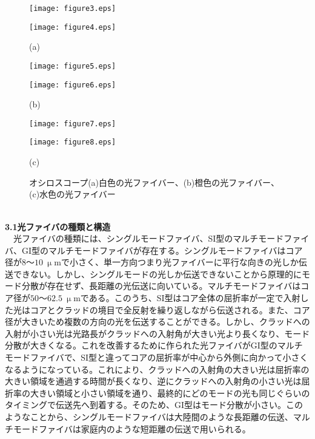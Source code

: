 \documentclass[a4paper,10.5pt]{ltjsarticle}
\begin{document}
\begin{figure}[h]
  \centering
  \vspace{20pt}\begin{minipage}[h]{0.8\linewidth}
    \begin{minipage}[h]{0.53\linewidth}
      \texttt{[image: figure3.eps]}
    \end{minipage}
    \begin{minipage}[h]{0.5\linewidth}
      \texttt{[image: figure4.eps]}
    \end{minipage}
    \caption*{(a)}
  \end{minipage}
  \begin{minipage}[h]{0.8\linewidth}
    \begin{minipage}[h]{0.53\linewidth}
      \texttt{[image: figure5.eps]}
    \end{minipage}
    \begin{minipage}[h]{0.5\linewidth}
      \texttt{[image: figure6.eps]}
    \end{minipage}
    \caption*{(b)}
  \end{minipage}
  \begin{minipage}[h]{0.8\linewidth}
    \begin{minipage}[h]{0.53\linewidth}
      \texttt{[image: figure7.eps]}
    \end{minipage}
    \begin{minipage}[h]{0.5\linewidth}
      \texttt{[image: figure8.eps]}
    \end{minipage}
    \caption*{(c)}
  \end{minipage}
  \caption{オシロスコープ(a)白色の光ファイバー、(b)橙色の光ファイバー、(c)水色の光ファイバー}
  \label{scope}
\end{figure}
\clearpage
\hspace{-2pt}{\Large \bfseries 3.考察}\\
{\large \bfseries 3.1光ファイバの種類と構造}\\
　光ファイバの種類には、シングルモードファイバ、SI型のマルチモードファイバ、GI型のマルチモードファイバが存在する。シングルモードファイバはコア径が$8〜10\ \mathrm{\upmu m}$で小さく、単一方向つまり光ファイバーに平行な向きの光しか伝送できない。しかし、シングルモードの光しか伝送できないことから原理的にモード分散が存在せず、長距離の光伝送に向いている。マルチモードファイバはコア径が$50〜62.5\ \mathrm{\upmu m}$である。このうち、SI型はコア全体の屈折率が一定で入射した光はコアとクラッドの境目で全反射を繰り返しながら伝送される。また、コア径が大きいため複数の方向の光を伝送することができる。しかし、クラッドへの入射が小さい光は光路長がクラッドへの入射角が大きい光より長くなり、モード分散が大きくなる。これを改善するために作られた光ファイバがGI型のマルチモードファイバで、SI型と違ってコアの屈折率が中心から外側に向かって小さくなるようになっている。これにより、クラッドへの入射角の大きい光は屈折率の大きい領域を通過する時間が長くなり、逆にクラッドへの入射角の小さい光は屈折率の大きい領域と小さい領域を通り、最終的にどのモードの光も同じぐらいのタイミングで伝送先へ到着する。そのため、GI型はモード分散が小さい。このようなことから、シングルモードファイバは大陸間のような長距離の伝送、マルチモードファイバは家庭内のような短距離の伝送で用いられる。\\
\end{document}
